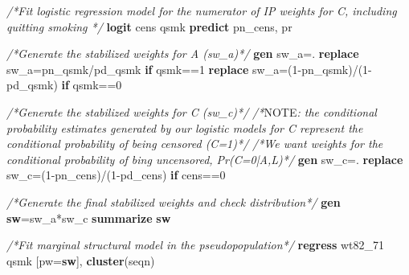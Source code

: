 \documentclass[
  10pt,
]{book}
\newenvironment{Shaded}{\begin{snugshade}}{\end{snugshade}}
\newcommand{\AlertTok}[1]{\textcolor[rgb]{0.94,0.16,0.16}{#1}}
\newcommand{\CommentTok}[1]{\textcolor[rgb]{0.56,0.35,0.01}{\textit{#1}}}
\newcommand{\KeywordTok}[1]{\textcolor[rgb]{0.13,0.29,0.53}{\textbf{#1}}}
\newcommand{\NormalTok}[1]{#1}
\begin{document}
\begin{Shaded}
\begin{Highlighting}[]
\CommentTok{/*Fit logistic regression model for the  numerator of IP weights for C, including quitting smoking */}
\KeywordTok{logit}\NormalTok{ cens qsmk}
\KeywordTok{predict}\NormalTok{ pn_cens, pr}

\CommentTok{/*Generate the stabilized weights for A (sw_a)*/}
\KeywordTok{gen}\NormalTok{ sw_a=.}
\KeywordTok{replace}\NormalTok{ sw_a=pn_qsmk/pd_qsmk }\KeywordTok{if}\NormalTok{ qsmk==1}
\KeywordTok{replace}\NormalTok{ sw_a=(1-pn_qsmk)/(1-pd_qsmk) }\KeywordTok{if}\NormalTok{ qsmk==0}

\CommentTok{/*Generate the stabilized weights for C (sw_c)*/}
\CommentTok{/*}\AlertTok{NOTE}\CommentTok{: the conditional probability estimates generated by our logistic models for C represent the conditional probability of being censored (C=1)*/}
\CommentTok{/*We want weights for the conditional probability of bing uncensored, Pr(C=0|A,L)*/}
\KeywordTok{gen}\NormalTok{ sw_c=.}
\KeywordTok{replace}\NormalTok{ sw_c=(1-pn_cens)/(1-pd_cens) }\KeywordTok{if}\NormalTok{ cens==0}

\CommentTok{/*Generate the final stabilized weights and check distribution*/}
\KeywordTok{gen} \KeywordTok{sw}\NormalTok{=sw_a*sw_c}
\KeywordTok{summarize} \KeywordTok{sw}

\CommentTok{/*Fit marginal structural model in the pseudopopulation*/}
\KeywordTok{regress}\NormalTok{ wt82_71 qsmk [pw=}\KeywordTok{sw}\NormalTok{], }\KeywordTok{cluster}\NormalTok{(seqn)}
\end{Highlighting}
\end{Shaded}
\end{document}
